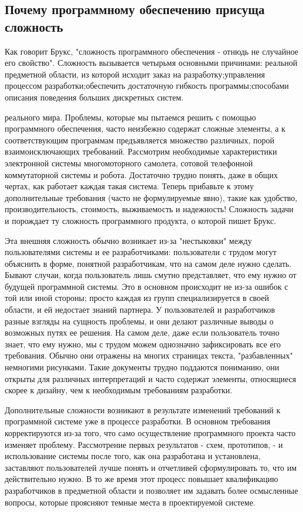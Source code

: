 \documentclass[11pt]{article}
\begin{document}
\subsection{Почему программному обеспечению присуща сложность}
\par
Как говорит Брукс, "сложность программного обеспечения - отнюдь не случайное его свойство". Сложность вызывается четырьмя основными причинами: 
{\itemize
{} реальной предметной области, из которой исходит заказ на разработку; управления процессом разработки; обеспечить достаточную гибкость программы; способами описания поведения больших дискретных систем.}
\par
{ реального мира.} Проблемы, которые мы пытаемся решить с помощью программного обеспечения, часто неизбежно содержат сложные элементы, а к соответствующим программам предъявляется множество различных, порой взаимоисключающих требований. Рассмотрим необходимые характеристики электронной системы многомоторного самолета, сотовой телефонной коммутаторной системы и робота. Достаточно трудно понять, даже в общих чертах, как работает каждая такая система. Теперь прибавьте к этому дополнительные требования (часто не формулируемые явно), такие как удобство, производительность, стоимость, выживаемость и надежность! Сложность задачи и порождает ту сложность программного продукта, о которой пишет Брукс.
\par
Эта внешняя сложность обычно возникает из-за "нестыковки" между пользователями системы и ее разработчиками: пользователи с трудом могут объяснить в форме, понятной разработчикам, что на самом деле нужно сделать. Бывают случаи, когда пользователь лишь смутно представляет, что ему нужно от будущей программной системы. Это в основном происходит не из-за ошибок с той или иной стороны; просто каждая из групп специализируется в своей области, и ей недостает знаний партнера. У пользователей и разработчиков разные взгляды на сущность проблемы, и они делают различные выводы о возможных путях ее решения. На самом деле, даже если пользователь точно знает, что ему нужно, мы с трудом можем однозначно зафиксировать все его требования. Обычно они отражены на многих страницах текста, "разбавленных" немногими рисунками. Такие документы трудно поддаются пониманию, они открыты для различных интерпретаций и часто содержат элементы, относящиеся скорее к дизайну, чем к необходимым требованиям разработки.
\par
Дополнительные сложности возникают в результате изменений требований к программной системе уже в процессе разработки. В основном требования корректируются из-за того, что само осуществление программного проекта часто изменяет проблему. Рассмотрение первых результатов - схем, прототипов, - и использование системы после того, как она разработана и установлена, заставляют пользователей лучше понять и отчетливей сформулировать то, что им действительно нужно. В то же время этот процесс повышает квалификацию разработчиков в предметной области и позволяет им задавать более осмысленные вопросы, которые проясняют темные места в проектируемой системе. 
\end{document}
